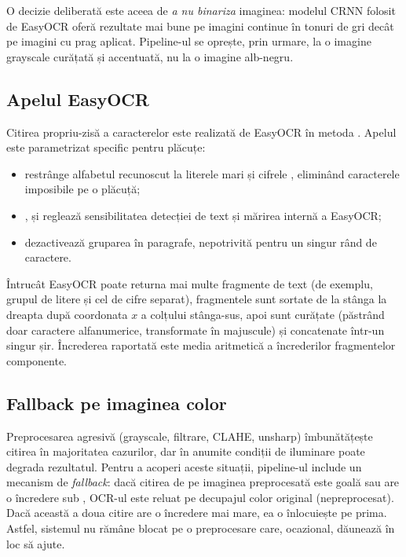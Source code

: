 \documentclass[../../main.tex]{subfiles}
\begin{document}
O decizie deliberată este aceea de \textit{a nu binariza} imaginea: modelul CRNN folosit de
EasyOCR oferă rezultate mai bune pe imagini continue în tonuri de gri decât pe imagini cu prag
aplicat. Pipeline-ul se oprește, prin urmare, la o imagine grayscale curățată și accentuată,
nu la o imagine alb-negru.

\subsection{Apelul EasyOCR}
\label{subsec:apel_easyocr}

Citirea propriu-zisă a caracterelor este realizată de EasyOCR în metoda \linebreak
{}. Apelul  este parametrizat specific
pentru plăcuțe:

\begin{itemize}
    \item {} restrânge alfabetul recunoscut la literele mari
     și cifrele , eliminând caracterele imposibile pe o
    plăcuță;
    \item {},  și
     reglează sensibilitatea detecției de text și mărirea internă a
    EasyOCR;
    \item {} dezactivează gruparea în paragrafe, nepotrivită pentru
    un singur rând de caractere.
\end{itemize}

Întrucât EasyOCR poate returna mai multe fragmente de text (de exemplu, grupul de litere și
cel de cifre separat), fragmentele sunt sortate de la stânga la dreapta după coordonata $x$ a
colțului stânga-sus, apoi sunt curățate (păstrând doar caractere alfanumerice, transformate în
majuscule) și concatenate într-un singur șir. Încrederea raportată este media aritmetică a
încrederilor fragmentelor componente.

\subsection{Fallback pe imaginea color}
\label{subsec:fallback_color}

Preprocesarea agresivă (grayscale, filtrare, CLAHE, unsharp) îmbunătățește citirea în
majoritatea cazurilor, dar în anumite condiții de iluminare poate degrada rezultatul. Pentru
a acoperi aceste situații, pipeline-ul include un mecanism de \textit{fallback}: dacă citirea
de pe imaginea preprocesată este goală sau are o încredere sub , OCR-ul este
reluat pe decupajul color original (nepreprocesat). Dacă această a doua citire are o încredere
mai mare, ea o înlocuiește pe prima. Astfel, sistemul nu rămâne blocat pe o preprocesare care,
ocazional, dăunează în loc să ajute.
\end{document}
